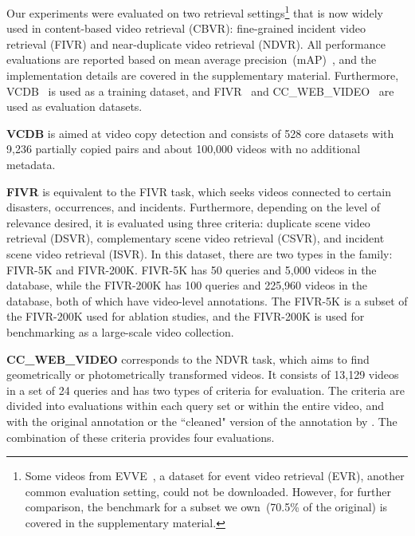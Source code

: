 \documentclass[10pt,twocolumn,letterpaper]{article}
\begin{document}
        Our experiments were evaluated on two retrieval settings\footnote{Some videos from EVVE~\cite{revaud2013event}, a dataset for event video retrieval (EVR), another common evaluation setting, could not be downloaded. However, for further comparison, the benchmark for a subset we own~(70.5\% of the original) is covered in the supplementary material.} that is now widely used in content-based video retrieval (CBVR): fine-grained incident video retrieval (FIVR) and near-duplicate video retrieval (NDVR). All performance evaluations are reported based on mean average precision~(mAP)~\cite{zhu2004recall}, and the implementation details are covered in the supplementary material. Furthermore, VCDB~\cite{jiang2014vcdb} is used as a training dataset, and FIVR~\cite{kordopatis2019fivr} and CC\_WEB\_VIDEO~\cite{wu2009real} are used as evaluation datasets.
        
        \textbf{VCDB} is aimed at video copy detection and consists of 528 core datasets with 9,236 partially copied pairs and about 100,000 videos with no additional metadata. 

        \textbf{FIVR} is equivalent to the FIVR task, which seeks videos connected to certain disasters, occurrences, and incidents. Furthermore, depending on the level of relevance desired, it is evaluated using three criteria: duplicate scene video retrieval (DSVR), complementary scene video retrieval (CSVR), and incident scene video retrieval (ISVR). In this dataset, there are two types in the family: FIVR-5K and FIVR-200K. FIVR-5K has 50 queries and 5,000 videos in the database, while the FIVR-200K has 100 queries and 225,960 videos in the database, both of which have video-level annotations. The FIVR-5K is a subset of the FIVR-200K used for ablation studies, and the FIVR-200K is used for benchmarking as a large-scale video collection.
        
        \textbf{CC\_WEB\_VIDEO} corresponds to the NDVR task, which aims to find geometrically or photometrically transformed videos. It consists of 13,129 videos in a set of 24 queries and has two types of criteria for evaluation. The criteria are divided into evaluations within each query set or within the entire video, and with the original annotation or the ``cleaned" version of the annotation by \cite{kordopatis2019visil}. The combination of these criteria provides four evaluations.
    
\end{document}
